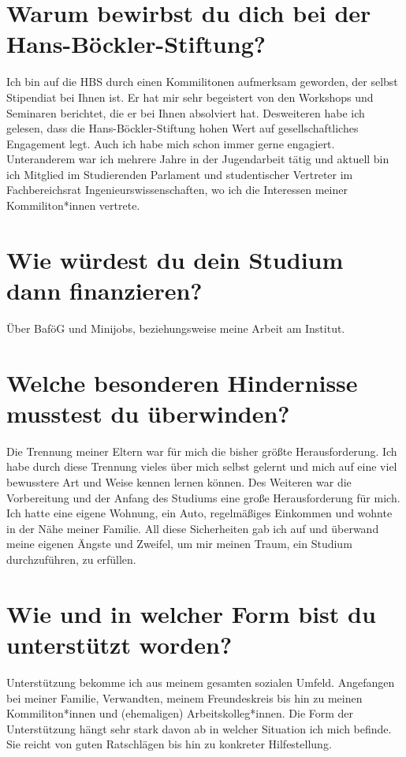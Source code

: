 \documentclass[12pt]{scrreprt}
\begin{document}
\section*{Warum bewirbst du dich bei der Hans-Böckler-Stiftung?}

    Ich bin auf die HBS durch einen Kommilitonen aufmerksam geworden, der selbst Stipendiat bei Ihnen ist.
    Er hat mir sehr begeistert von den Workshops und Seminaren berichtet, die er bei Ihnen absolviert hat.
    Desweiteren habe ich gelesen, dass die Hans-Böckler-Stiftung hohen Wert auf gesellschaftliches Engagement legt.
    Auch ich habe mich schon immer gerne engagiert. Unteranderem war ich mehrere Jahre in der Jugendarbeit tätig 
    und aktuell bin ich Mitglied im Studierenden Parlament und studentischer Vertreter im Fachbereichsrat Ingenieurswissenschaften, 
    wo ich die Interessen meiner Kommiliton*innen vertrete.    

    
\section*{Wie würdest du dein Studium dann finanzieren?}
    Über BaföG und Minijobs, beziehungsweise meine Arbeit am Institut.

\section*{Welche besonderen Hindernisse musstest du überwinden?}
    Die Trennung meiner Eltern war für mich die bisher größte Herausforderung. Ich
    habe durch diese Trennung vieles über mich selbst gelernt und mich auf eine viel
    bewusstere Art und Weise kennen lernen können.
    Des Weiteren war die Vorbereitung und der Anfang des Studiums eine große
    Herausforderung für mich. Ich hatte eine eigene Wohnung, ein Auto,
    regelmäßiges Einkommen und wohnte in der Nähe meiner Familie. All diese
    Sicherheiten gab ich auf und überwand meine eigenen Ängste und Zweifel, um mir meinen
    Traum, ein Studium durchzuführen, zu erfüllen.


\section*{Wie und in welcher Form bist du unterstützt worden?}
    Unterstützung bekomme ich aus meinem gesamten sozialen Umfeld. Angefangen bei meiner Familie,
    Verwandten, meinem Freundeskreis bis hin zu meinen Kommiliton*innen und (ehemaligen)
    Arbeitskolleg*innen.
    Die Form der Unterstützung hängt sehr stark davon ab in welcher Situation ich
    mich befinde. Sie reicht von guten Ratschlägen bis hin zu konkreter Hilfestellung.
\color{red}
\newpage
\end{document}
